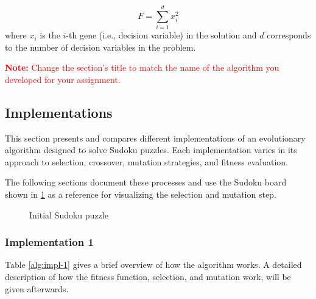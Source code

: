 \begin{equation}
    F = \sum_{i=1}^d x_i^2 
\end{equation}
where $x_i$ is the $i$-th gene (i.e., decision variable) in the solution and $d$ corresponds to the number of decision variables in the problem.

\textcolor{red}{\textbf{Note:} Change the section's title to match the name of the algorithm you developed for your assignment.}

\subsection{Implementations}
This section presents and compares different implementations of an evolutionary algorithm designed to solve Sudoku puzzles. Each implementation varies in its approach to selection, crossover, mutation strategies, and fitness evaluation.

The following sections document these processes and use the Sudoku board shown in \ref{fig:initial-sudoku} as a reference for visualizing the selection and mutation step.

\begin{figure}[h]
\centering
{}
\caption{Initial Sudoku puzzle}
\label{fig:initial-sudoku}
\end{figure}

\pagebreak %
\subsubsection{Implementation 1}\label{sec:impl-1}

Table \ref{alg:impl-1} gives a brief overview of how the algorithm works. A detailed description of how the fitness function, selection, and mutation work, will be given afterwards.

